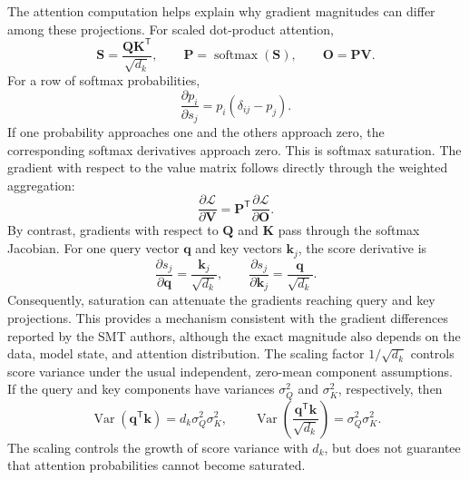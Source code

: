 The attention computation helps explain why gradient magnitudes can differ
among these projections. For scaled dot-product attention,
\begin{equation}
    \mathbf{S}
    =
    \frac{\mathbf{Q}\mathbf{K}^{\mathsf T}}{\sqrt{d_k}},
    \qquad
    \mathbf{P}
    =
    \operatorname{softmax}(\mathbf{S}),
    \qquad
    \mathbf{O}=\mathbf{P}\mathbf{V}.
    \label{eq:smt-attention}
\end{equation}
For a row of softmax probabilities,
\begin{equation}
    \frac{\partial p_i}{\partial s_j}
    =
    p_i(\delta_{ij}-p_j).
    \label{eq:smt-softmax-jacobian}
\end{equation}
If one probability approaches one and the others approach zero, the
corresponding softmax derivatives approach zero. This is softmax saturation.
The gradient with respect to the value matrix follows directly through the
weighted aggregation:
\begin{equation}
    \frac{\partial\mathcal{L}}{\partial\mathbf{V}}
    =
    \mathbf{P}^{\mathsf T}
    \frac{\partial\mathcal{L}}{\partial\mathbf{O}}.
    \label{eq:smt-value-gradient}
\end{equation}
By contrast, gradients with respect to $\mathbf{Q}$ and $\mathbf{K}$ pass
through the softmax Jacobian. For one query vector $\mathbf{q}$ and key
vectors $\mathbf{k}_j$, the score derivative is
\begin{equation}
    \frac{\partial s_j}{\partial\mathbf{q}}
    =
    \frac{\mathbf{k}_j}{\sqrt{d_k}},
    \qquad
    \frac{\partial s_j}{\partial\mathbf{k}_j}
    =
    \frac{\mathbf{q}}{\sqrt{d_k}}.
    \label{eq:smt-qk-score-derivative}
\end{equation}
Consequently, saturation can attenuate the gradients reaching query and key
projections. This provides a mechanism consistent with the gradient
differences reported by the SMT authors, although the exact magnitude also
depends on the data, model state, and attention distribution. The scaling
factor $1/\sqrt{d_k}$ controls score variance under the usual independent,
zero-mean component assumptions. If the query and key components have
variances $\sigma_Q^2$ and $\sigma_K^2$, respectively, then
\begin{equation}
    \operatorname{Var}(\mathbf{q}^{\mathsf T}\mathbf{k})
    =
    d_k\sigma_Q^2\sigma_K^2,
    \qquad
    \operatorname{Var}
    \left(
        \frac{\mathbf{q}^{\mathsf T}\mathbf{k}}{\sqrt{d_k}}
    \right)
    =
    \sigma_Q^2\sigma_K^2.
    \label{eq:smt-attention-variance}
\end{equation}
The scaling controls the growth of score variance with $d_k$, but does not
guarantee that attention probabilities cannot become saturated.

